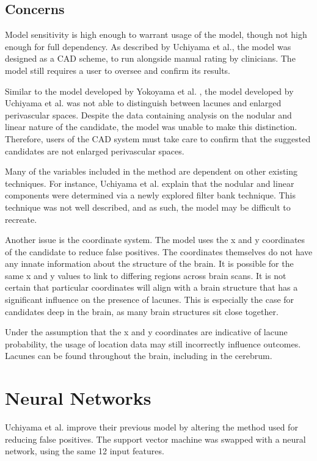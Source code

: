 \subsection*{Concerns}

Model sensitivity is high enough to warrant usage of the model, though not high enough for full dependency. As described by Uchiyama et al., the model was designed as a CAD scheme, to run alongside manual rating by clinicians. The model still requires a user to oversee and confirm its results. 
 
Similar to the model developed by Yokoyama et al. \cite{Yokoyama2007}, the model developed by Uchiyama et al. was not able to distinguish between lacunes and enlarged perivascular spaces. Despite the data containing analysis on the nodular and linear nature of the candidate, the model was unable to make this distinction. Therefore, users of the CAD system must take care to confirm that the suggested candidates are not enlarged perivascular spaces.

Many of the variables included in the method are dependent on other existing techniques. For instance, Uchiyama et al. explain that the nodular and linear components were determined via a newly explored filter bank technique. This technique was not well described, and as such, the model may be difficult to recreate.

Another issue is the coordinate system. The model uses the x and y coordinates of the candidate to reduce false positives. The coordinates themselves do not have any innate information about the structure of the brain. It is possible for the same x and y values to link to differing regions across brain scans. It is not certain that particular coordinates will align with a brain structure that has a significant influence on the presence of lacunes. This is especially the case for candidates deep in the brain, as many brain structures sit close together. 

Under the assumption that the x and y coordinates are indicative of lacune probability, the usage of location data may still incorrectly influence outcomes. Lacunes can be found throughout the brain, including in the cerebrum. 

\section{Neural Networks}

Uchiyama et al. \cite{Uchiyama2007b} improve their previous model \cite{Uchiyama20071554} by altering the method used for reducing false positives. The support vector machine was swapped with a neural network, using the same 12 input features.

